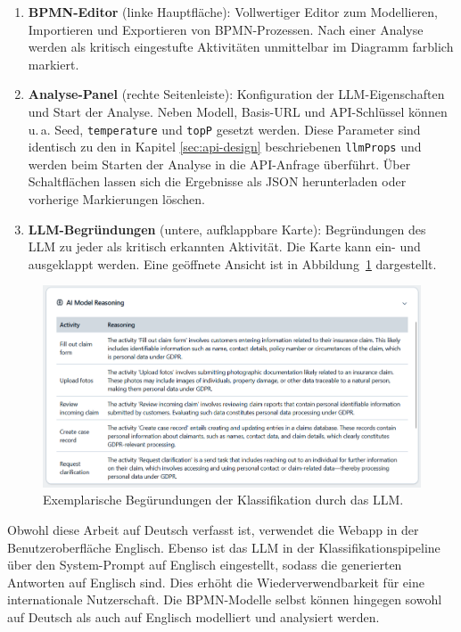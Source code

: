 \begin{enumerate}
    \item \textbf{BPMN-Editor} (linke Hauptfläche): Vollwertiger Editor zum Modellieren, Importieren und Exportieren von \ac{BPMN}-Prozessen. Nach einer Analyse werden als kritisch eingestufte Aktivitäten unmittelbar im Diagramm farblich markiert.
    \item \textbf{Analyse-Panel} (rechte Seitenleiste): Konfiguration der \ac{LLM}-Eigenschaften und Start der Analyse. Neben Modell, Basis-URL und API-Schlüssel können u.\,a. Seed, \texttt{temperature} und \texttt{topP} gesetzt werden. Diese Parameter sind identisch zu den in Kapitel \ref{sec:api-design} beschriebenen \texttt{llmProps} und werden beim Starten der Analyse in die API-Anfrage überführt. Über Schaltflächen lassen sich die Ergebnisse als JSON herunterladen oder vorherige Markierungen löschen.
    \item \textbf{\ac{LLM}-Begründungen} (untere, aufklappbare Karte): Begründungen des \ac{LLM} zu jeder als kritisch erkannten Aktivität. Die Karte kann ein- und ausgeklappt werden. Eine geöffnete Ansicht ist in Abbildung~\ref{fig:sandbox-frontend-ai-reasoning} dargestellt.
\end{enumerate}

\begin{figure}[h]
    \centering
    \includegraphics[width=.86\linewidth]{images/sandbox/sandbox-ai-reasoning}
    \caption{Exemplarische Begürundungen der Klassifikation durch das LLM.}
    \label{fig:sandbox-frontend-ai-reasoning}
\end{figure}

Obwohl diese Arbeit auf Deutsch verfasst ist, verwendet die Webapp in der Benutzeroberfläche Englisch. Ebenso ist das \ac{LLM} in der Klassifikationspipeline über den System-Prompt auf Englisch eingestellt, sodass die generierten Antworten auf Englisch sind. Dies erhöht die Wiederverwendbarkeit für eine internationale Nutzerschaft. Die \ac{BPMN}-Modelle selbst können hingegen sowohl auf Deutsch als auch auf Englisch modelliert und analysiert werden.